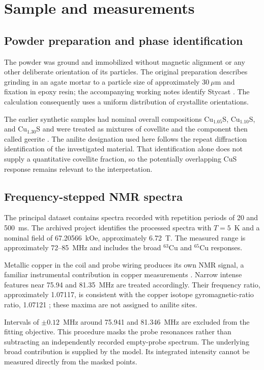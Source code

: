\documentclass[10pt,a4paper,twocolumn]{article}
\begin{document}
\section{Sample and measurements}

\subsection{Powder preparation and phase identification}

The powder was ground and immobilized without magnetic alignment or any other deliberate orientation of its particles. The original preparation describes grinding in an agate mortar to a particle size of approximately $30~\mu$m and fixation in epoxy resin; the accompanying working notes identify Stycast \citep[pp.~15--18]{Evlampiev2009}. The calculation consequently uses a uniform distribution of crystallite orientations.

The earlier synthetic samples had nominal overall compositions Cu$_{1.05}$S, Cu$_{1.10}$S, and Cu$_{1.30}$S and were treated as mixtures of covellite and the component then called geerite \citep{Evlampiev2009,Gainov2009}. The anilite designation used here follows the repeat diffraction identification of the investigated material. That identification alone does not supply a quantitative covellite fraction, so the potentially overlapping CuS response remains relevant to the interpretation.

\subsection{Frequency-stepped NMR spectra}

The principal dataset contains spectra recorded with repetition periods of 20 and 500~ms. The archived project identifies the processed spectra with $T=5$~K and a nominal field of 67.20566~kOe, approximately 6.72~T. The measured range is approximately 72--85~MHz and includes the broad $^{63}$Cu and $^{65}$Cu responses.

Metallic copper in the coil and probe wiring produces its own NMR signal, a familiar instrumental contribution in copper measurements \citep{Takeda2012}. Narrow intense features near 75.94 and 81.35~MHz are treated accordingly. Their frequency ratio, approximately 1.07117, is consistent with the copper isotope gyromagnetic-ratio ratio, 1.07121 \citep{Locher1974}; these maxima are not assigned to anilite sites.

Intervals of $\pm0.12$~MHz around 75.941 and 81.346~MHz are excluded from the fitting objective. This procedure masks the probe resonances rather than subtracting an independently recorded empty-probe spectrum. The underlying broad contribution is supplied by the model. Its integrated intensity cannot be measured directly from the masked points.
\end{document}
